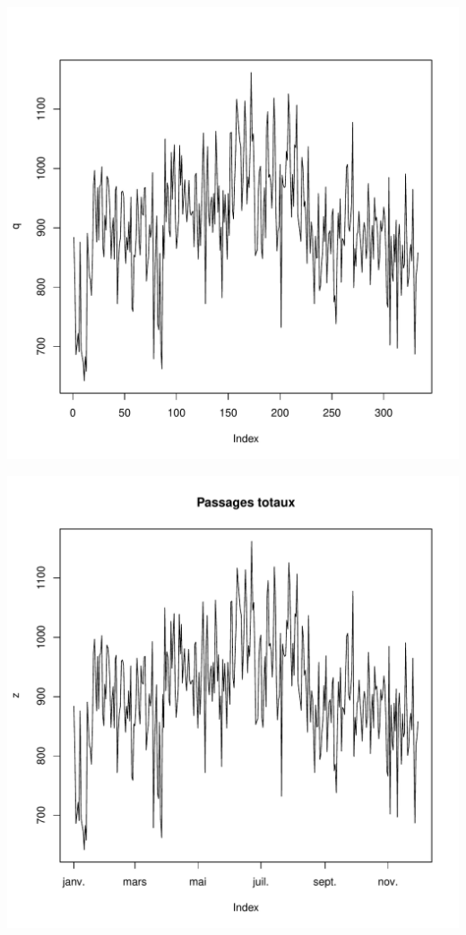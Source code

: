 \documentclass[12pt,english,french,twoside]{report}\usepackage[]{graphicx}\usepackage[]{color}
\makeatletter
\def\maxwidth{ %
  \ifdim\Gin@nat@width>\linewidth
    \linewidth
  \else
    \Gin@nat@width
  \fi
}
\newenvironment{kframe}{%
 \def\at@end@of@kframe{}%
 \ifinner\ifhmode%
  \def\at@end@of@kframe{\end{minipage}}%
  \begin{minipage}{\columnwidth}%
 \fi\fi%
 \def\FrameCommand##1{\hskip\@totalleftmargin \hskip-\fboxsep
 \colorbox{shadecolor}{##1}\hskip-\fboxsep
     \hskip-\linewidth \hskip-\@totalleftmargin \hskip\columnwidth}%
 \MakeFramed {\advance\hsize-\width
   \@totalleftmargin\z@ \linewidth\hsize
   \@setminipage}}%
 {\par\unskip\endMakeFramed%
 \at@end@of@kframe}
\makeatother
\begin{document}
\includegraphics[width=\maxwidth]{figure/passages_totaux1} 
\begin{kframe}

{\ttfamily\noindent\bfseries{}}\end{kframe}
\includegraphics[width=\maxwidth]{figure/passages_totaux2} 
\end{document}
